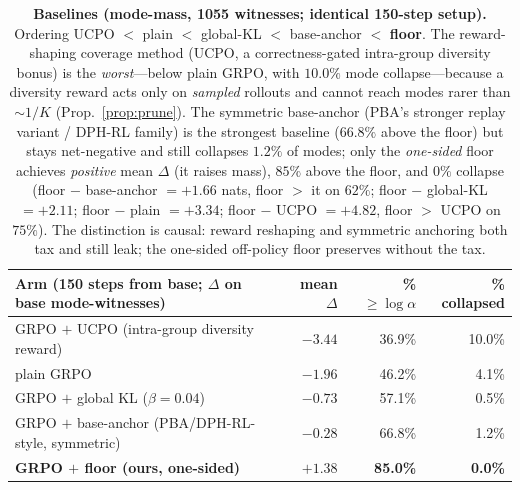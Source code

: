 \documentclass[11pt]{article}
\theoremstyle{definition}
\begin{document}
\begin{table}[h]\centering\small
\begin{tabular}{lrrr}
\toprule
Arm (150 steps from base; $\Delta$ on base mode-witnesses) & mean $\Delta$ & \% $\ge\log\alpha$ & \% collapsed \\
\midrule
GRPO $+$ UCPO (intra-group diversity reward) & $-3.44$ & 36.9\% & 10.0\%\\
plain GRPO                    & $-1.96$ & 46.2\% & 4.1\%\\
GRPO $+$ global KL ($\beta{=}0.04$) & $-0.73$ & 57.1\% & 0.5\%\\
GRPO $+$ base-anchor (PBA/DPH-RL-style, symmetric) & $-0.28$ & 66.8\% & 1.2\%\\
\textbf{GRPO $+$ floor (ours, one-sided)} & $\mathbf{+1.38}$ & \textbf{85.0\%} & \textbf{0.0\%}\\
\bottomrule
\end{tabular}
\caption{\textbf{Baselines (mode-mass, 1055 witnesses; identical 150-step setup).} Ordering
UCPO $<$ plain $<$ global-KL $<$ base-anchor $<$ \textbf{floor}. The reward-shaping coverage method
(UCPO, a correctness-gated intra-group diversity bonus) is the \emph{worst}---below plain GRPO, with
$10.0\%$ mode collapse---because a diversity reward acts only on \emph{sampled} rollouts and cannot
reach modes rarer than $\sim1/K$ (Prop.~\ref{prop:prune}). The symmetric base-anchor (PBA's stronger
replay variant / DPH-RL family) is the strongest baseline ($66.8\%$ above the floor) but stays
net-negative and still collapses $1.2\%$ of modes; only the \emph{one-sided} floor achieves
\emph{positive} mean $\Delta$ (it raises mass), $85\%$ above the floor, and $0\%$ collapse
(floor $-$ base-anchor $=+1.66$ nats, floor $>$ it on $62\%$; floor $-$ global-KL $=+2.11$; floor $-$
plain $=+3.34$; floor $-$ UCPO $=+4.82$, floor $>$ UCPO on $75\%$). The distinction is causal:
reward reshaping and symmetric anchoring both tax and still leak; the one-sided off-policy floor
preserves without the tax.}
\label{tab:baselines}
\end{table}
\end{document}
